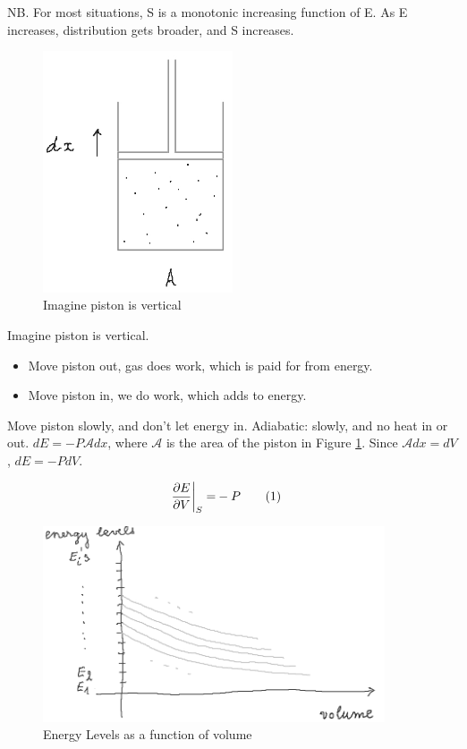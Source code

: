 \documentclass[]{article}
\newcommand\numberthis{\addtocounter{equation}{1}\tag{\theequation}}
\begin{document}
NB. For most situations, S is a monotonic increasing function of E. As E increases, distribution gets broader, and S increases. 

\begin{figure}[H]
	\begin{center}
		\caption{Imagine piston is vertical}\label{fig:vertical:piston}
		\includegraphics[width=0.5\textwidth]{vertical-piston}
	\end{center}
\end{figure}

Imagine piston is vertical.

\begin{itemize}
	\item Move piston out, gas does work, which is paid for from energy.
	\item Move piston in, we do work, which adds to energy.
\end{itemize}

Move piston slowly, and don't let energy in. Adiabatic: slowly, and no heat in or out. $dE = - P \mathcal{A}dx$, where $\mathcal{A}$ is the area of the piston in Figure \ref{fig:vertical:piston}. Since $\mathcal{A}dx = dV$, $dE = -P dV$. 

\begin{align*}
\frac{\partial E}{\partial V}\bigg|_S =& - P\numberthis \label{eq:defP}
\end{align*}

\begin{figure}[H]
	\caption{Energy Levels as a function of volume}
	\includegraphics[width=0.9\textwidth]{energy-levels-volume}
\end{figure}
\end{document}

